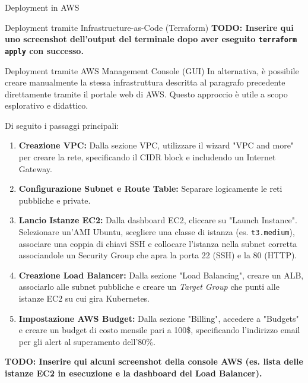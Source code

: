 \begin{mychapter}{Deployment in AWS}
\begin{mysection}{Deployment tramite Infrastructure-as-Code (Terraform)}
\textbf{TODO: Inserire qui uno screenshot dell'output del terminale dopo aver eseguito \texttt{terraform apply} con successo.}
\end{mysection}

\begin{mysection}{Deployment tramite AWS Management Console (GUI)}
In alternativa, è possibile creare manualmente la stessa infrastruttura descritta al paragrafo precedente direttamente tramite il portale web di AWS. Questo approccio è utile a scopo esplorativo e didattico.

Di seguito i passaggi principali:
\begin{enumerate}
    \item \textbf{Creazione VPC:} Dalla sezione VPC, utilizzare il wizard "VPC and more" per creare la rete, specificando il CIDR block e includendo un Internet Gateway.
    \item \textbf{Configurazione Subnet e Route Table:} Separare logicamente le reti pubbliche e private.
    \item \textbf{Lancio Istanze EC2:} Dalla dashboard EC2, cliccare su "Launch Instance". Selezionare un'AMI Ubuntu, scegliere una classe di istanza (es. \texttt{t3.medium}), associare una coppia di chiavi SSH e collocare l'istanza nella subnet corretta associandole un Security Group che apra la porta 22 (SSH) e la 80 (HTTP).
    \item \textbf{Creazione Load Balancer:} Dalla sezione "Load Balancing", creare un ALB, associarlo alle subnet pubbliche e creare un \textit{Target Group} che punti alle istanze EC2 su cui gira Kubernetes.
    \item \textbf{Impostazione AWS Budget:} Dalla sezione "Billing", accedere a "Budgets" e creare un budget di costo mensile pari a 100\$, specificando l'indirizzo email per gli alert al superamento dell'80\%.
\end{enumerate}

\textbf{TODO: Inserire qui alcuni screenshot della console AWS (es. lista delle istanze EC2 in esecuzione e la dashboard del Load Balancer).}

\end{mysection}

\end{mychapter}
